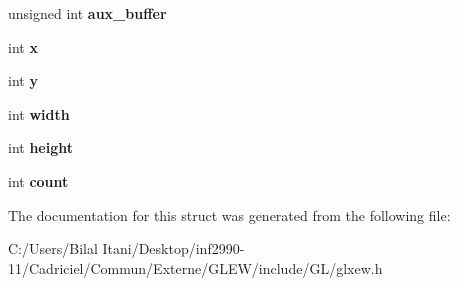\begin{DoxyCompactItemize}
\item 
unsigned int {\bfseries aux\+\_\+buffer}\hypertarget{struct_g_l_x_pbuffer_clobber_event_a13193b6e7e3e52b15f754fe91403b7ec}{}\label{struct_g_l_x_pbuffer_clobber_event_a13193b6e7e3e52b15f754fe91403b7ec}

\item 
int {\bfseries x}\hypertarget{struct_g_l_x_pbuffer_clobber_event_a8f0a7162a033c89ee94ce535580dbc32}{}\label{struct_g_l_x_pbuffer_clobber_event_a8f0a7162a033c89ee94ce535580dbc32}

\item 
int {\bfseries y}\hypertarget{struct_g_l_x_pbuffer_clobber_event_a69eb7ac60d36ac3ec4550ac206cfc61f}{}\label{struct_g_l_x_pbuffer_clobber_event_a69eb7ac60d36ac3ec4550ac206cfc61f}

\item 
int {\bfseries width}\hypertarget{struct_g_l_x_pbuffer_clobber_event_aaca375fecb872c73c60cd5d0bfc7c7a5}{}\label{struct_g_l_x_pbuffer_clobber_event_aaca375fecb872c73c60cd5d0bfc7c7a5}

\item 
int {\bfseries height}\hypertarget{struct_g_l_x_pbuffer_clobber_event_aed4e539c896bdad15217bf92c28f8520}{}\label{struct_g_l_x_pbuffer_clobber_event_aed4e539c896bdad15217bf92c28f8520}

\item 
int {\bfseries count}\hypertarget{struct_g_l_x_pbuffer_clobber_event_a61e9f6b31738464dca67f909fcacd298}{}\label{struct_g_l_x_pbuffer_clobber_event_a61e9f6b31738464dca67f909fcacd298}

\end{DoxyCompactItemize}


The documentation for this struct was generated from the following file\+:\begin{DoxyCompactItemize}
\item 
C\+:/\+Users/\+Bilal Itani/\+Desktop/inf2990-\/11/\+Cadriciel/\+Commun/\+Externe/\+G\+L\+E\+W/include/\+G\+L/glxew.\+h\end{DoxyCompactItemize}
